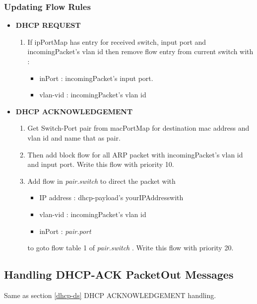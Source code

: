 \documentclass{article}
\begin{document}
\subsubsection{Updating Flow Rules}

\begin{itemize}
	\item \textbf{DHCP REQUEST}

		\begin{enumerate}
			\item If ipPortMap has entry for received switch, input port and incomingPacket's vlan id then remove flow entry from current switch with :

				\begin{itemize}
					\item inPort : incomingPacket's input port.
					\item vlan-vid : incomingPacket's vlan id
				\end{itemize}
				
		\end{enumerate}
	\item \textbf{DHCP ACKNOWLEDGEMENT}

		\begin{enumerate}
			\item Get Switch-Port pair from macPortMap for destination mac address and vlan id and name that as pair.
			\item Then add block flow for all ARP packet with incomingPacket's vlan id and input port. Write this flow with priority 10.
			\item Add flow in \textit{pair.switch} to direct the packet with 

				\begin{itemize}

					\item IP address : dhcp-payload's yourIPAddresswith 
					\item vlan-vid : incomingPacket's vlan id 
					\item inPort : \textit{pair.port}
				\end{itemize}

				to goto flow table 1 of \textit{pair.switch} . Write this flow with priority 20.
		\end{enumerate}
		
\end{itemize}




\subsection{Handling DHCP-ACK PacketOut Messages}

Same as section \ref{dhcp-ds} DHCP ACKNOWLEDGEMENT handling.


\printbibliography
\end{document}
